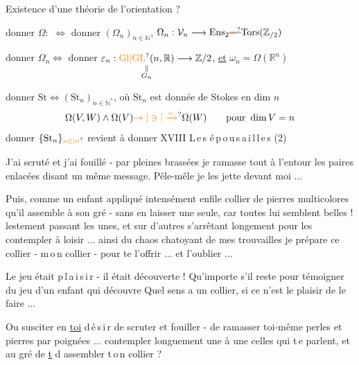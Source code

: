  Existence d'une théorie de l'orientation ?

donner $\Omega:$ $\Longleftrightarrow$ donner $(\Omega_n)_{n\in\mathbb{N}}$, $\Omega_n:\mathcal V_n\longrightarrow\mathrm{Ens}_2\deleted{\unsure{=}}\mathrm{Tors}(\mathbb{Z}_{/2})$

donner $\Omega_n\Longleftrightarrow$ donner $\varepsilon_n:\underset{\substack{\Vert\\G_n}}{\unsure{\mathrm{Gl}|\mathrm{GL}}(n,\mathbb{R})}\longrightarrow\mathbb{Z}/2$, \uline{et} $\omega_n=\Omega(\mathbb{R}^n)$

donner $\mathrm{St}\Longleftrightarrow(\mathrm{St}_n)_{n\in\mathbb{N}^{*}}$, où $\mathrm{St}_n$ est donnée de Stokes en dim $n$
\[
\Omega(V,W)\wedge\Omega(V)\unsure{\to|\ni|\xrightarrow{\sim}}\Omega(W)\qquad\text{pour }\dim V=n
\]
donner $\{\mathrm{St}_n\}_{\unsure{n\in{}|n}}$ revient à  donner
XVIII \qquad L\,e\,s \quad é\,p\,o\,u\,s\,a\,i\,l\,l\,e\,s \qquad (2)

J'ai scruté et j'ai fouillé - par pleines brassées je ramasse tout à l'entour les paires enlacées disant un même message. Pêle-mêle je les jette devant moi ...

Puis, comme un enfant appliqué intensément enfile collier de pierres multicolores qu'il assemble à son gré - sans en laisser une seule, car toutes lui semblent belles !  lestement passant les unes, et sur d'autres s'arrêtant longement pour les contempler à loisir ... ainsi du chaos chatoyant de mes trouvailles je prépare ce collier - m\,o\,n collier - pour te l'offrir ... et  l'oublier ...

Le jeu était p\,l\,a\,i\,s\,i\,r - il était découverte ! Qu'importe s'il reste  pour témoigner du jeu  d'un enfant qui découvre \handwritten{!} Quel sens a un collier, si ce n'est le plaisir de le faire ...

Ou  susciter en \uline{toi} d\,é\,s\,i\,r de scruter et fouiller - de ramasser toi-même perles et pierres par poignées ... contempler longuement une à une celles qui t\,e parlent, et au gré de  \uline{t} d  assembler t\,o\,n collier ?


